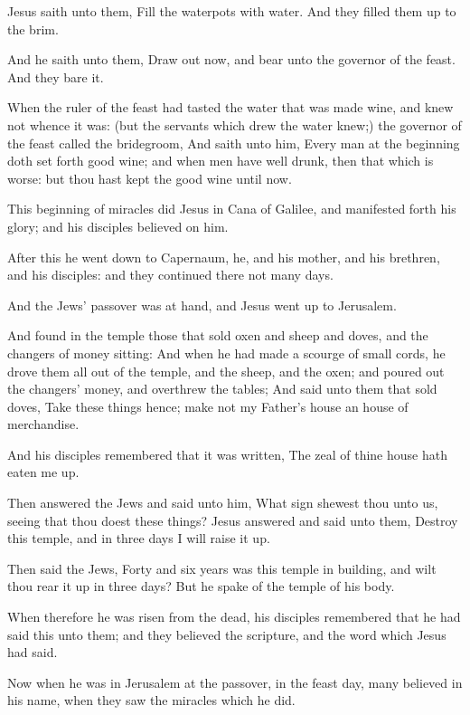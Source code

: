 \Verse Jesus saith unto them, Fill the waterpots with water. And they filled them up to the brim.

\Verse And he saith unto them, Draw out now, and bear unto the governor of the feast. And they bare it.

\Verse When the ruler of the feast had tasted the water that was made wine, and knew not whence it was: (but the servants which drew the water knew;) the governor of the feast called the bridegroom, \Verse And saith unto him, Every man at the beginning doth set forth good wine; and when men have well drunk, then that which is worse: but thou hast kept the good wine until now.

\Verse This beginning of miracles did Jesus in Cana of Galilee, and manifested forth his glory; and his disciples believed on him.

\Verse After this he went down to Capernaum, he, and his mother, and his brethren, and his disciples: and they continued there not many days.

\Verse And the Jews' passover was at hand, and Jesus went up to Jerusalem.

\Verse And found in the temple those that sold oxen and sheep and doves, and the changers of money sitting: \Verse And when he had made a scourge of small cords, he drove them all out of the temple, and the sheep, and the oxen; and poured out the changers' money, and overthrew the tables; \Verse And said unto them that sold doves, Take these things hence; make not my Father's house an house of merchandise.

\Verse And his disciples remembered that it was written, The zeal of thine house hath eaten me up.

\Verse Then answered the Jews and said unto him, What sign shewest thou unto us, seeing that thou doest these things?  \Verse Jesus answered and said unto them, Destroy this temple, and in three days I will raise it up.

\Verse Then said the Jews, Forty and six years was this temple in building, and wilt thou rear it up in three days?  \Verse But he spake of the temple of his body.

\Verse When therefore he was risen from the dead, his disciples remembered that he had said this unto them; and they believed the scripture, and the word which Jesus had said.

\Verse Now when he was in Jerusalem at the passover, in the feast day, many believed in his name, when they saw the miracles which he did.


